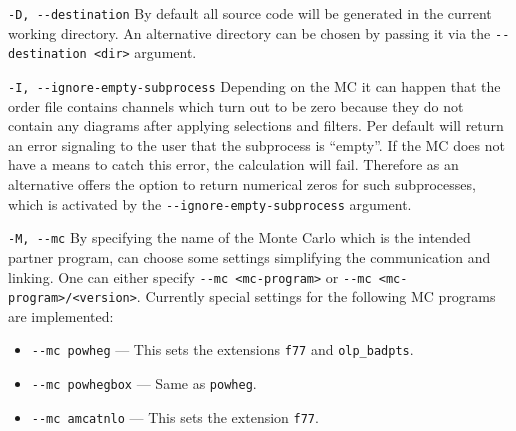 \begin{basedescript}{\desclabelstyle{\pushlabel}}
%
      \item[\hspace{-1em}]\colorbox{gray!30}{\lstinline[style=sh]|-D, --destination|} By default all source code will be generated in the current working directory. An alternative directory can be chosen by passing it via the \lstinline[style=sh]|--destination <dir>| argument.
%
      \item[\hspace{-1em}]\colorbox{gray!30}{\lstinline[style=sh]|-I, --ignore-empty-subprocess|} Depending on the MC it can happen that the order file contains channels which turn out to be zero because they do not contain any diagrams after applying selections and filters. Per default \gosam will return an error signaling to the user that the subprocess is ``empty''. If the MC does not have a means to catch this error, the calculation will fail. Therefore as an alternative \gosam offers the option to return numerical zeros for such subprocesses, which is activated by the \lstinline[style=sh]|--ignore-empty-subprocess| argument.
%
      \item[\hspace{-1em}]\colorbox{gray!30}{\lstinline[style=sh]|-M, --mc|} By specifying the name of the Monte Carlo which is the intended partner program, \gosam can choose some settings simplifying the communication and linking. One can either specify \lstinline[style=sh]|--mc <mc-program>| or \lstinline[style=sh]|--mc <mc-program>/<version>|. Currently special settings for the following MC programs are implemented:
            \begin{itemize}
                  \item[\hspace{-1em}]\lstinline[style=sh]|--mc powheg| --- This sets the extensions \texttt{f77} and \texttt{olp\_badpts}.
                  \item[\hspace{-1em}]\lstinline[style=sh]|--mc powhegbox| --- Same as \texttt{powheg}.
                  \item[\hspace{-1em}]\lstinline[style=sh]|--mc amcatnlo| --- This sets the extension \texttt{f77}.
            \end{itemize}

\end{basedescript}
